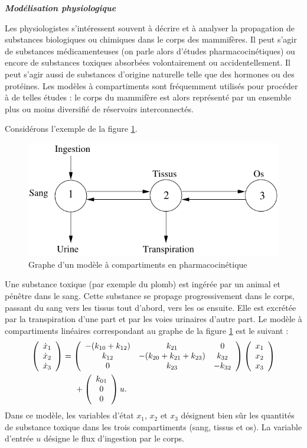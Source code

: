 \begin{exemple}{\bf \em Modélisation physiologique}

Les physiologistes s'intéressent souvent à décrire et à analyser la 
propagation de substances biologiques ou chimiques dans le corps des
mammifères. Il peut s'agir de substances médicamenteuses (on parle alors
d'études pharmacocinétiques) ou encore de substances toxiques absorbées
volontairement ou accidentellement. Il peut s'agir aussi de substances d'origine
naturelle telle que des hormones ou des protéines. Les modèles à 
compartiments sont fréquemment utilisés pour procéder à de telles 
études : le corps du mammifère est alors représenté par un ensemble
plus ou moins diversifié de réservoirs interconnectés. 

Considérons l'exemple
de la figure \ref{Fig:grapharmaco}.
\begin{figure}[ht] 
\begin{center}
\includegraphics{images/grapharmaco}
\caption{Graphe d'un modèle à compartiments en pharmacocinétique}
\label{Fig:grapharmaco}
\end{center} 
\end{figure}
Une substance toxique (par exemple du plomb) est ingérée par un animal et
pénêtre dans le sang. Cette substance  se propage progressivement
dans le corps, passant du sang vers les tissus tout d'abord, vers les os ensuite.
Elle est excrétée par la transpiration d'une part et par les voies urinaires
d'autre part. Le modèle à compartiments linéaires correspondant
au graphe de la figure \ref{Fig:grapharmaco} est le suivant :
\begin{equation*} \begin{split}
\bma{c} \dot x_1 \\ \dot x_2 \\ \dot x_3 \ema &= 
\bma{ccc} -(k_{10} + k_{12}) & k_{21} & 0 \\ 
k_{12} & -(k_{20} + k_{21} + k_{23}) & k_{32} \\ 0 & k_{23} & - k_{32} \ema
\bma{c} x_1 \\ x_2 \\ x_3 \ema \\
& \hd + \bma{c} k_{ 01}\\ 0 \\ 0 \ema u.
\end{split} \end{equation*}
Dans ce modèle, les variables d'état $x_1$, $x_2$ et $x_3$ désignent
bien s\^ur les quantités de substance toxique dans les trois compartiments
(sang, tissus et os). La variable d'entrée $u$ désigne le flux d'ingestion 
par le corps.
\cqfd
\end{exemple}

